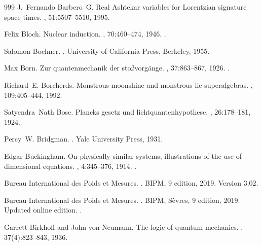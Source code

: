 \begin{thebibliography}{999}
J.~Fernando Barbero~G.
\newblock Real {Ashtekar} variables for {Lorentzian} signature space-times.
, 51:5507--5510, 1995.

Felix Bloch.
\newblock Nuclear induction.
, 70:460--474, 1946.
\newblock \href {https://doi.org/10.1103/PhysRev.70.460}
  {}.

Salomon Bochner.
.
\newblock University of California Press, Berkeley, 1955.

Max Born.
\newblock Zur quantenmechanik der sto{\ss}vorg{\"a}nge.
, 37:863--867, 1926.
\newblock \href {https://doi.org/10.1007/BF01397477}
  {}.

Richard~E. Borcherds.
\newblock Monstrous moonshine and monstrous lie superalgebras.
, 109:405--444, 1992.

Satyendra~Nath Bose.
\newblock Plancks gesetz und lichtquantenhypothese.
, 26:178--181, 1924.

Percy~W. Bridgman.
.
\newblock Yale University Press, 1931.

Edgar Buckingham.
\newblock On physically similar systems; illustrations of the use of
  dimensional equations.
, 4:345--376, 1914.
\newblock \href {https://doi.org/10.1103/PhysRev.4.345}
  {}.

{Bureau International des Poids et Mesures}.
.
\newblock BIPM, 9 edition, 2019.
\newblock Version 3.02.

{Bureau International des Poids et Mesures}.
.
\newblock BIPM, S\`evres, 9 edition, 2019.
\newblock Updated online edition.
\newblock \href {https://doi.org/10.59161/AUEZ1291}
  {}.

Garrett Birkhoff and John von Neumann.
\newblock The logic of quantum mechanics.
, 37(4):823--843, 1936.


\end{thebibliography}
